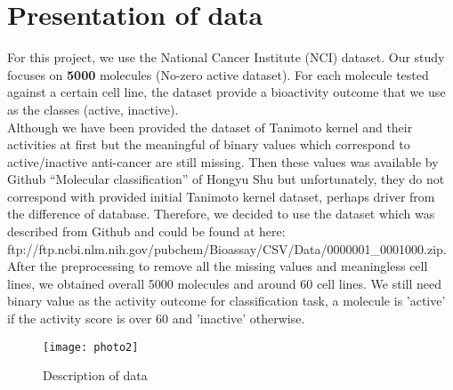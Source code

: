 \documentclass[12pt]{article}
\begin{document}
\section{Presentation of data}
For this project, we use the National Cancer Institute (NCI) dataset. Our study focuses on \textbf{5000} molecules (No-zero active dataset). For each molecule tested against a certain cell line, the dataset provide a bioactivity outcome that we use as the classes (active, inactive).\\
Although we have been provided the dataset of Tanimoto kernel and their activities at first but the meaningful of binary values which correspond to active/inactive anti-cancer are still missing. Then these values was available by Github “Molecular classification” of Hongyu Shu but unfortunately, they do not correspond with provided initial Tanimoto kernel dataset, perhaps driver from the difference of database. Therefore, we decided to use the dataset which was described from Github and could be found at here:\\ ftp://ftp.ncbi.nlm.nih.gov/pubchem/Bioassay/CSV/Data/0000001\_0001000.zip. \\
After the preprocessing to remove all the missing values and meaningless cell lines, we obtained overall 5000 molecules and around 60 cell lines. We still need binary value as the activity outcome for classification task, a molecule is 'active' if the activity score is over 60 and 'inactive' otherwise.

\begin{figure}[ht]
	\centering
	\caption{Description of data}
	\texttt{[image: photo2]}
\end{figure}
\end{document}
